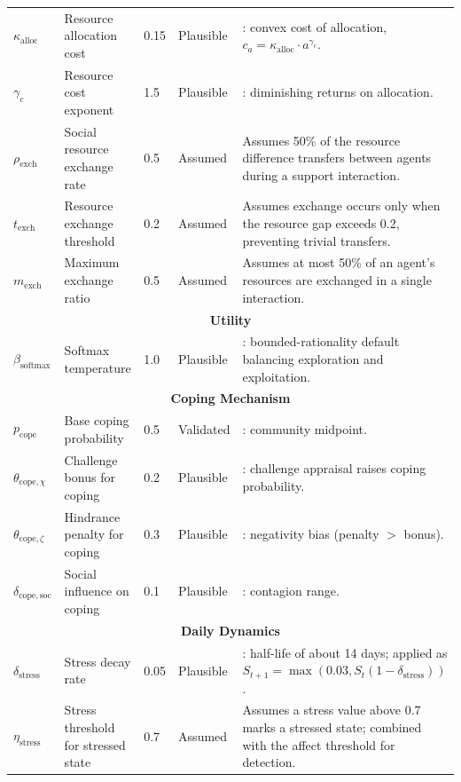 \documentclass[
  letterpaper,
  DIV=11,
  numbers=noendperiod]{scrartcl}
\begin{document}
\begin{longtable}{lp{2.4cm}p{1.6cm}p{1.7cm}p{5.2cm}}
$\kappa_{\mathrm{alloc}}$ & Resource allocation cost & 0.15 & Plausible & \cite{Hobfoll1989}: convex cost of allocation, $c_a = \kappa_{\mathrm{alloc}} \cdot a^{\gamma_c}$. \\
$\gamma_c$ & Resource cost exponent & 1.5 & Plausible & \cite{Hobfoll1989}: diminishing returns on allocation. \\
$\rho_{\mathrm{exch}}$ & Social resource exchange rate & 0.5 & Assumed & Assumes 50\% of the resource difference transfers between agents during a support interaction. \\
$t_{\mathrm{exch}}$ & Resource exchange threshold & 0.2 & Assumed & Assumes exchange occurs only when the resource gap exceeds 0.2, preventing trivial transfers. \\
$m_{\mathrm{exch}}$ & Maximum exchange ratio & 0.5 & Assumed & Assumes at most 50\% of an agent's resources are exchanged in a single interaction. \\
\midrule
\multicolumn{5}{c}{\textbf{Utility}} \\
\midrule
$\beta_{\mathrm{softmax}}$ & Softmax temperature & 1.0 & Plausible & \cite{simon1955a}: bounded-rationality default balancing exploration and exploitation. \\
\midrule
\multicolumn{5}{c}{\textbf{Coping Mechanism}} \\
\midrule
$p_{\mathrm{cope}}$ & Base coping probability & 0.5 & Validated & \cite{skinner2003}: community midpoint. \\
$\theta_{\mathrm{cope},\chi}$ & Challenge bonus for coping & 0.2 & Plausible & \cite{cavanaugh2000}: challenge appraisal raises coping probability. \\
$\theta_{\mathrm{cope},\zeta}$ & Hindrance penalty for coping & 0.3 & Plausible & \cite{bakker2017}: negativity bias (penalty $>$ bonus). \\
$\delta_{\mathrm{cope,soc}}$ & Social influence on coping & 0.1 & Plausible & \cite{Boomgaard2018}: contagion range. \\
\midrule
\multicolumn{5}{c}{\textbf{Daily Dynamics}} \\
\midrule
$\delta_{\mathrm{stress}}$ & Stress decay rate & 0.05 & Plausible & \cite{folkman2020stress}: half-life of about 14 days; applied as $S_{t+1} = \max(0.03, S_t(1 - \delta_{\mathrm{stress}}))$. \\
$\eta_{\mathrm{stress}}$ & Stress threshold for stressed state & 0.7 & Assumed & Assumes a stress value above 0.7 marks a stressed state; combined with the affect threshold for detection. \\

\end{longtable}
\end{document}
